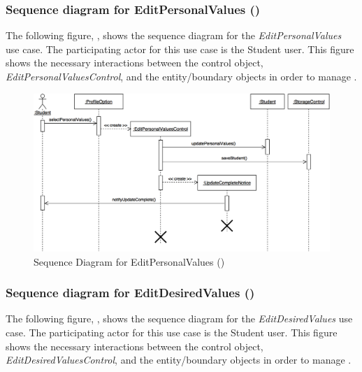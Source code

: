 \documentclass[12pt,letterpaper]{article}
\begin{document}
\subsubsection*{Sequence diagram for EditPersonalValues ()}

The following figure, , shows the sequence diagram for the {\it EditPersonalValues} use case. The participating actor for this use case is
the Student user. This figure shows the necessary interactions between the control object, {\it EditPersonalValuesControl}, and the
entity/boundary objects in order to manage .

\begin{figure}[H]
	\centering{}
	\includegraphics[scale=0.25]{imgs/seq/edit-personal-values.png}
	\caption[ - Sequence Diagram for EditPersonalValues]{Sequence Diagram for EditPersonalValues ()}
\end{figure}

\subsubsection*{Sequence diagram for EditDesiredValues ()}

The following figure, , shows the sequence diagram for the {\it EditDesiredValues} use case. The participating actor for this use case is
the Student user. This figure shows the necessary interactions between the control object, {\it EditDesiredValuesControl}, and the
entity/boundary objects in order to manage .
\end{document}
